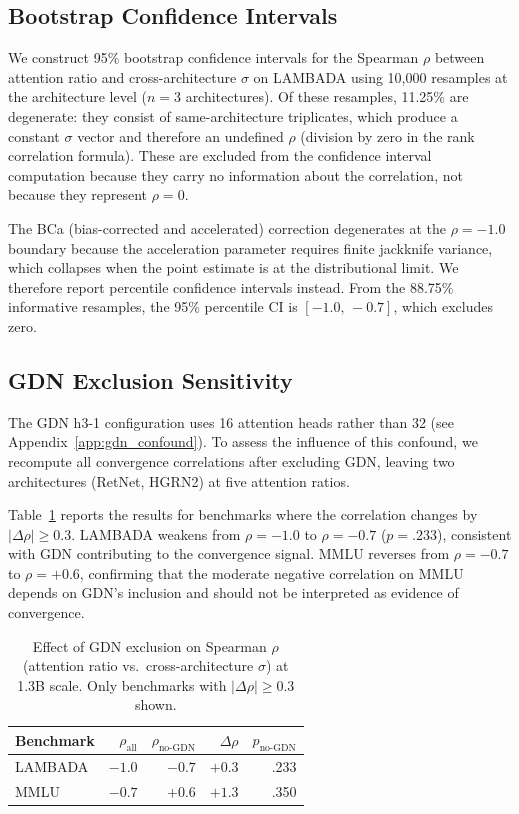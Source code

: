 \subsection{Bootstrap Confidence Intervals}

We construct 95\% bootstrap confidence intervals for the Spearman $\rho$ between attention ratio and cross-architecture $\sigma$ on LAMBADA using 10{,}000 resamples at the architecture level ($n = 3$ architectures). Of these resamples, 11.25\% are degenerate: they consist of same-architecture triplicates, which produce a constant $\sigma$ vector and therefore an undefined $\rho$ (division by zero in the rank correlation formula). These are excluded from the confidence interval computation because they carry no information about the correlation, not because they represent $\rho = 0$.

The BCa (bias-corrected and accelerated) correction degenerates at the $\rho = -1.0$ boundary because the acceleration parameter requires finite jackknife variance, which collapses when the point estimate is at the distributional limit. We therefore report percentile confidence intervals instead. From the 88.75\% informative resamples, the 95\% percentile CI is $[-1.0,\,-0.7]$, which excludes zero.

\subsection{GDN Exclusion Sensitivity}

The GDN h3-1 configuration uses 16 attention heads rather than 32 (see Appendix~\ref{app:gdn_confound}). To assess the influence of this confound, we recompute all convergence correlations after excluding GDN, leaving two architectures (RetNet, HGRN2) at five attention ratios.

Table~\ref{tab:gdn_sensitivity} reports the results for benchmarks where the correlation changes by $|\Delta\rho| \geq 0.3$. LAMBADA weakens from $\rho = -1.0$ to $\rho = -0.7$ ($p = .233$), consistent with GDN contributing to the convergence signal. MMLU reverses from $\rho = -0.7$ to $\rho = +0.6$, confirming that the moderate negative correlation on MMLU depends on GDN's inclusion and should not be interpreted as evidence of convergence.

\begin{table}[ht]
\centering
\small
\caption{Effect of GDN exclusion on Spearman $\rho$ (attention ratio vs.\ cross-architecture $\sigma$) at 1.3B scale. Only benchmarks with $|\Delta\rho| \geq 0.3$ shown.}
\label{tab:gdn_sensitivity}
\begin{tabular}{lrrrr}
\toprule
Benchmark & $\rho_{\text{all}}$ & $\rho_{\text{no-GDN}}$ & $\Delta\rho$ & $p_{\text{no-GDN}}$ \\
\midrule
LAMBADA & $-1.0$ & $-0.7$ & $+0.3$ & .233 \\
MMLU & $-0.7$ & $+0.6$ & $+1.3$ & .350 \\
\bottomrule
\end{tabular}
\end{table}

